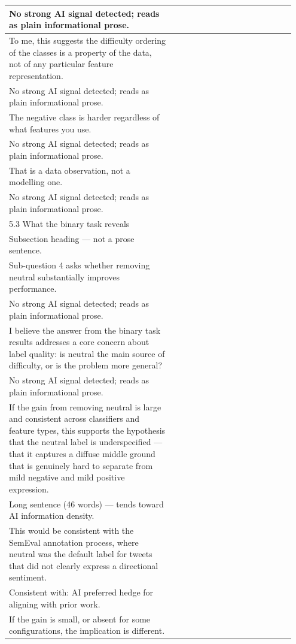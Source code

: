 \documentclass[11pt]{article}
\begin{document}
\begin{longtable}{|p{0.55\linewidth}|p{0.40\linewidth}|}
\hline
No strong AI signal detected; reads as plain informational prose. & \\
\hline
To me, this suggests the difficulty ordering of the classes is a property of the data, not of any particular feature representation. & \\[2pt]
\hline
No strong AI signal detected; reads as plain informational prose. & \\
\hline
The negative class is harder regardless of what features you use. & \\[2pt]
\hline
No strong AI signal detected; reads as plain informational prose. & \\
\hline
That is a data observation, not a modelling one. & \\[2pt]
\hline
No strong AI signal detected; reads as plain informational prose. & \\
\hline
5.3 What the binary task reveals & \\[2pt]
\hline
Subsection heading --- not a prose sentence. & \\
\hline
Sub-question 4 asks whether removing neutral substantially improves performance. & \\[2pt]
\hline
No strong AI signal detected; reads as plain informational prose. & \\
\hline
I believe the answer from the binary task results addresses a core concern about label quality: is neutral the main source of difficulty, or is the problem more general? & \\[2pt]
\hline
No strong AI signal detected; reads as plain informational prose. & \\
\hline
If the gain from removing neutral is large and consistent across classifiers and feature types, this supports the hypothesis that the neutral label is underspecified --- that it captures a diffuse middle ground that is genuinely hard to separate from mild negative and mild positive expression. & \\[2pt]
\hline
Long sentence (46 words) --- tends toward AI information density. & \\
\hline
This would be consistent with the SemEval annotation process, where neutral was the default label for tweets that did not clearly express a directional sentiment. & \\[2pt]
\hline
Consistent with: AI preferred hedge for aligning with prior work. & \\
\hline
If the gain is small, or absent for some configurations, the implication is different. & \\[2pt]

\end{longtable}
\end{document}
